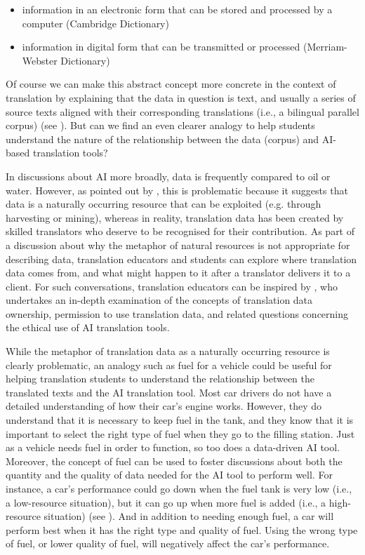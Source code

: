\documentclass[output=paper]{langscibook}
\begin{document}
\begin{itemize}
\item information in an electronic form that can be stored and processed by a computer (Cambridge Dictionary)
\item information in digital form that can be transmitted or processed (Merriam-Webster Dictionary)
\end{itemize}
Of course we can make this abstract concept more concrete in the context of translation by explaining that the data in question is text, and usually a series of source texts aligned with their corresponding translations (i.e., a bilingual parallel corpus) (see ). But can we find an even clearer analogy to help students understand the nature of the relationship between the data (corpus) and AI-based translation tools?

In discussions about AI more broadly, data is frequently compared to oil or water. However, as pointed out by \citet{kenny2011}, this is problematic because it suggests that data is a naturally occurring resource that can be exploited (e.g. through harvesting or mining), whereas in reality, translation data has been created by skilled translators who deserve to be recognised for their contribution. As part of a discussion about why the metaphor of natural resources is not appropriate for describing data, translation educators and students can explore where translation data comes from, and what might happen to it after a translator delivers it to a client. For such conversations, translation educators can be inspired by \citet{moorkens2022_ethics}, who undertakes an in-depth examination of the concepts of translation data ownership, permission to use translation data, and related questions concerning the ethical use of AI translation tools.

While the metaphor of translation data as a naturally occurring resource is clearly problematic, an analogy such as fuel for a vehicle could be useful for helping translation students to understand the relationship between the translated texts and the AI translation tool. Most car drivers do not have a detailed understanding of how their car’s engine works. However, they do understand that it is necessary to keep fuel in the tank, and they know that it is important to select the right type of fuel when they go to the filling station. Just as a vehicle needs fuel in order to function, so too does a data-driven AI tool. Moreover, the concept of fuel can be used to foster discussions about both the quantity and the quality of data needed for the AI tool to perform well. For instance, a car’s performance could go down when the fuel tank is very low (i.e., a low-resource situation), but it can go up when more fuel is added (i.e., a high-resource situation) (see ). And in addition to needing enough fuel, a car will perform best when it has the right type and quality of fuel. Using the wrong type of fuel, or lower quality of fuel, will negatively affect the car’s performance.
\end{document}
